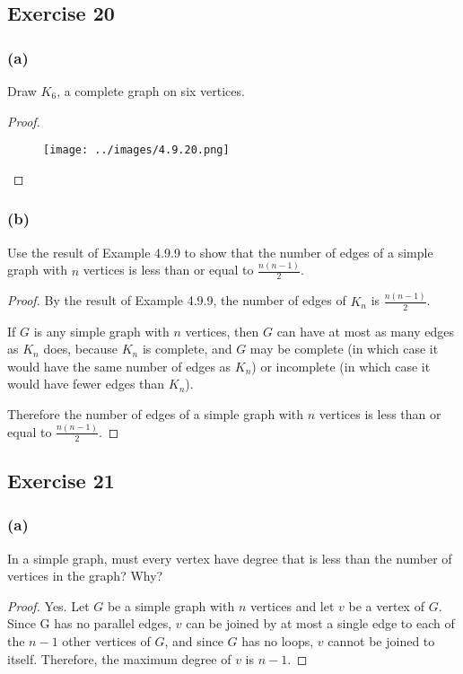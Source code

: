 \documentclass[14pt]{extarticle}
\begin{document}
\subsection{Exercise 20}
\subsubsection{(a)}
Draw $K_6$, a complete graph on six vertices.

\begin{proof}
    \begin{figure}[ht!]
        \centering
        \texttt{[image: ../images/4.9.20.png]}
    \end{figure}
\end{proof}

\subsubsection{(b)}
Use the result of Example 4.9.9 to show that the number of edges of a simple graph with $n$ vertices is less than or equal to $\frac{n(n - 1)}{2}$.

\begin{proof}
    By the result of Example 4.9.9, the number of edges of $K_n$ is $\frac{n(n - 1)}{2}$.

    If $G$ is any simple graph with $n$ vertices, then $G$ can have at most as many edges as $K_n$ does, because $K_n$ is complete, and $G$ may be complete (in which case it would have the same number of edges as $K_n$) or incomplete (in which case it would have fewer edges than $K_n$).

    Therefore the number of edges of a simple graph with $n$ vertices is less than or equal to $\frac{n(n - 1)}{2}$.
\end{proof}

\subsection{Exercise 21}

\subsubsection{(a)}
In a simple graph, must every vertex have degree that is less than the number of vertices in the graph? Why?

\begin{proof}
    Yes. Let $G$ be a simple graph with $n$ vertices and let $v$ be a vertex of $G$. Since G has no parallel edges, $v$ can be joined by at most a single edge to each of the $n - 1$ other vertices of $G$, and since $G$ has no loops, $v$ cannot be joined to itself. Therefore, the maximum degree of $v$ is $n - 1$.
\end{proof}
\end{document}
